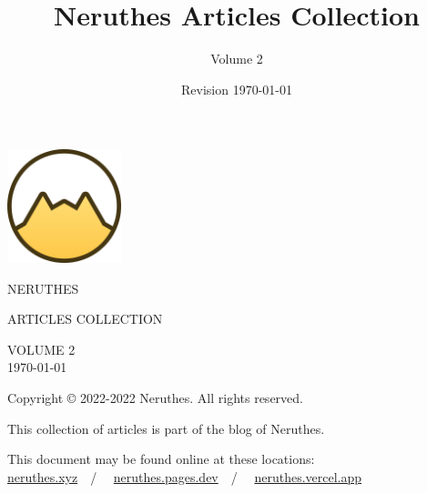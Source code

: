 \documentclass[12pt,a4paper]{report}
\title{Neruthes Articles Collection}
\author{Volume 2}
\date{Revision \today}
\begin{document}
\begin{titlepage}
	\center
	\ttfamily
	\includegraphics[width=33mm]{wwwsrc/neruthes-forceCircle-unpadded.png}\par
	\vskip 110pt
		{\fontsize{30pt}{30pt}\selectfont\MakeUppercase{Neruthes}}\par\vskip 30pt
		{\LARGE\MakeUppercase{Articles Collection}}\par
	\vfill
	\normalsize
	\MakeUppercase{
		Volume 2\\
		\today}\par
\end{titlepage}
\pagestyle{plain}
\tableofcontents\clearpage





\rmfamily








\clearpage\pagestyle{empty}
\leavevmode\vfill
\footnotesize\sffamily
Copyright \copyright{} 2022-2022 Neruthes. All rights reserved.\par
This collection of articles is part of the blog of Neruthes.\par
This document may be found online at these locations:\\
\href{https://neruthes.xyz/articles/Neruthes_articles_vol002.pdf}{neruthes.xyz}~~/~~%
\href{https://neruthes.pages.dev/articles/Neruthes_articles_vol002.pdf}{neruthes.pages.dev}~~/~~%
\href{https://neruthes.vercel.app/articles/Neruthes_articles_vol002.pdf}{neruthes.vercel.app}
\end{document}
